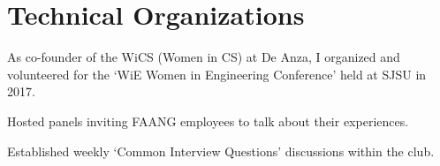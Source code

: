 \documentclass[]{deedy-resume-openfont}
\begin{document}
\begin{minipage}[t]{0.66\textwidth}
\sectionsep




\section{Technical Organizations} 

\begin{tightemize}
\item As co-founder of the WiCS (Women in CS) at De Anza, I organized and volunteered for the ‘WiE Women in Engineering Conference’ held at SJSU in 2017.
\item Hosted panels inviting FAANG employees to talk about their experiences.
\item Established weekly ‘Common Interview Questions’ discussions within the club.
\end{tightemize}



% 
% 

\end{minipage} 
\end{document}
